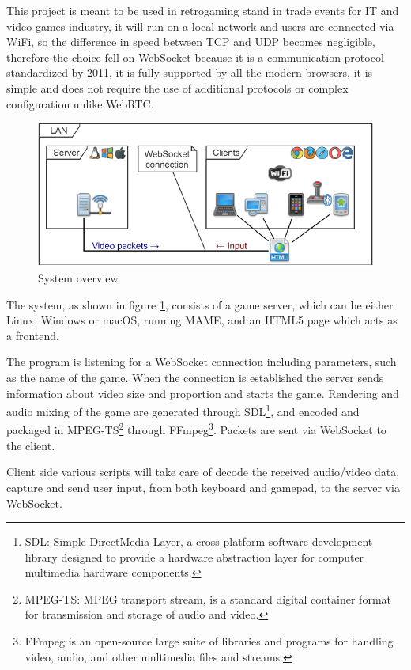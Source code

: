 This project is meant to be used in retrogaming stand in trade events for IT and video games industry, it will run on a local network and users are connected via WiFi, so the difference in speed between TCP and UDP becomes negligible, therefore the choice fell on WebSocket because it is a communication protocol standardized by 2011, it is fully supported by all the modern browsers, it is simple and does not require the use of additional protocols or complex configuration unlike WebRTC.

\begin{figure}[H]
	\includegraphics[width=\linewidth]{immagini/proposed_system}
	\caption{System overview}
	\label{fig:proposed_system}
\end{figure}

The system, as shown in figure \ref{fig:proposed_system}, consists of a game server, which can be either Linux, Windows or macOS, running MAME, and an HTML5 page which acts as a frontend.

The program is listening for a WebSocket connection including parameters, such as the name of the game. When the connection is established the server sends information about video size and proportion and starts the game. Rendering and audio mixing of the game are generated through SDL\footnote{SDL: Simple DirectMedia Layer, a cross-platform software development library designed to provide a hardware abstraction layer for computer multimedia hardware components.}, and encoded and packaged in MPEG-TS\footnote{MPEG-TS: MPEG transport stream, is a standard digital container format for transmission and storage of audio and video.} through FFmpeg\footnote{FFmpeg is an open-source large suite of libraries and programs for handling video, audio, and other multimedia files and streams.}. Packets are sent via WebSocket to the client.

Client side various scripts will take care of decode the received audio/video data, capture and send user input, from both keyboard and gamepad, to the server via WebSocket.